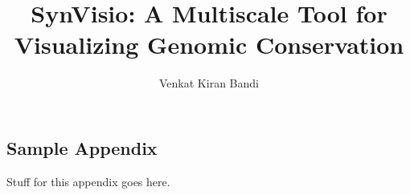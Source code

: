 \documentclass{uofsthesis-cs}
\title{SynVisio: A Multiscale Tool for Visualizing Genomic Conservation}
\author{Venkat Kiran Bandi}
\begin{document}
\maketitle

\frontmatter















%

\uofsappendix

\begin{appendices}

\chapter{Sample Appendix}

Stuff for this appendix goes here.

\end{appendices}
\end{document}
